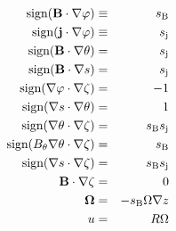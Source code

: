 \begin{align}
\textrm{sign}({\bf B} \cdot \nabla \varphi)&\equiv& s_{\rm B} \\
\textrm{sign}({\bf j} \cdot \nabla \varphi)&\equiv&s_{\rm j} \\
\textrm{sign}({\bf B} \cdot \nabla \theta)&=& s_{\rm j} \\
\textrm{sign}({\bf B} \cdot \nabla s)&=& s_{\rm j} \\
\textrm{sign}(\nabla \varphi \cdot \nabla \zeta)&=& -1 \\
\textrm{sign}(\nabla s \cdot \nabla \theta)&=& 1\\
\textrm{sign}(\nabla \theta \cdot \nabla \zeta)&=& s_{\rm B} s_{\rm j} \\
\textrm{sign}(B_\theta \nabla \theta \cdot \nabla \zeta)&=& s_{\rm B} \\
\textrm{sign}(\nabla s \cdot \nabla \zeta)&=& s_{\rm B} s_{\rm j} \\
{\bf B} \cdot \nabla \zeta&=& 0 \\
{\bf \Omega} &=& -s_{\rm B} \Omega \nabla z \\
u &=& R \Omega 
\end{align}

